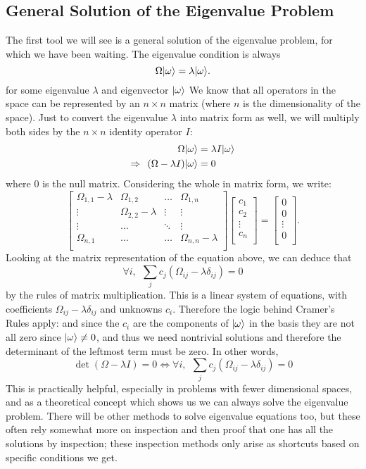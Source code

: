 \subsection{General Solution of the Eigenvalue Problem}
The first tool we will see is a general solution of the eigenvalue problem, for which we have been waiting. The eigenvalue condition is always
$$
\Omega|\omega\rangle = \lambda|\omega\rangle.
$$
for some eigenvalue $\lambda$ and eigenvector $|\omega\rangle$
We know that all operators in the space can be represented by an $n\times n$ matrix (where $n$ is the dimensionality of the space). Just to convert the eigenvalue $\lambda$ into matrix form as well, we will multiply both sides by the $n\times n$ identity operator $I$:
$$
\begin{aligned}
\Omega|\omega\rangle &= \lambda I|\omega\rangle\\
\Rightarrow\:\: (\Omega-\lambda I)|\omega\rangle &= 0
\end{aligned}
$$
where 0 is the null matrix. Considering the whole in matrix form, we write:
$$
\begin{bmatrix}
\Omega_{1,1}-\lambda & \Omega_{1,2} & \dots  & \Omega_{1,n} \\ 
\vdots  &   \Omega_{2,2}-\lambda & \vdots & \vdots \\ 
\vdots &  \dots & \ddots & \vdots \\
\Omega_{n,1} & \dots & \dots & \Omega_{n,n}-\lambda\\ 
\end{bmatrix}
\begin{bmatrix}
c_{1} \\ 
c_{2} \\ 
\vdots \\ 
c_{n} \\ 
\end{bmatrix}
= 
\begin{bmatrix}
0 \\
0 \\
\vdots \\ 
0 \\
\end{bmatrix}.
$$
Looking at the matrix representation of the equation above, we can deduce that
$$
\forall i, \:\: \sum_{j}c_{j}(\Omega_{ij}-\lambda\delta_{ij})=0
$$
by the rules of matrix multiplication. This is a linear system of equations, with coefficients $\Omega_{ij}-\lambda\delta_{ij}$ and unknowns $c_{i}$. Therefore the logic behind Cramer's Rules apply: and since the $c_{i}$ are the components of $|\omega\rangle$ in the basis they are not all zero since $|\omega\rangle \neq 0$, and thus we need nontrivial solutions and therefore the determinant of the leftmost term must be zero. In other words,
$$
\det(\Omega-\lambda I) = 0 \iff
\forall i, \:\: \sum_{j}c_{j}(\Omega_{ij}-\lambda\delta_{ij})=0
$$
This is practically helpful, especially in problems with fewer dimensional spaces, and as a theoretical concept which shows us we can always solve the eigenvalue problem. There will be other methods to solve eigenvalue equations too, but these often rely somewhat more on inspection and then proof that one has all the solutions by inspection; these inspection methods only arise as shortcuts based on specific conditions we get.
